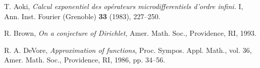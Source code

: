

\begin{thebibliography}{A}

 T. Aoki, \textit{Calcul exponentiel des op\'erateurs
microdifferentiels d'ordre infini.} I, Ann. Inst. Fourier (Grenoble)
\textbf{33} (1983), 227--250.

 R. Brown, \textit{On a conjecture of Dirichlet},
Amer. Math. Soc., Providence, RI, 1993.

 R. A. DeVore, \textit{Approximation of functions},
Proc. Sympos. Appl. Math., vol. 36,
Amer. Math. Soc., Providence, RI, 1986, pp. 34--56.

\end{thebibliography}

